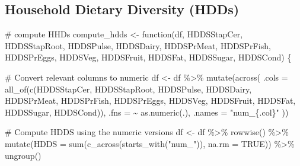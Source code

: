 \documentclass[
  letterpaper,
  DIV=11,
  numbers=noendperiod]{scrreprt}
\newenvironment{Shaded}{\begin{snugshade}}{\end{snugshade}}
\newcommand{\AttributeTok}[1]{\textcolor[rgb]{0.40,0.45,0.13}{#1}}
\newcommand{\CommentTok}[1]{\textcolor[rgb]{0.37,0.37,0.37}{#1}}
\newcommand{\ConstantTok}[1]{\textcolor[rgb]{0.56,0.35,0.01}{#1}}
\newcommand{\ControlFlowTok}[1]{\textcolor[rgb]{0.00,0.23,0.31}{#1}}
\newcommand{\FunctionTok}[1]{\textcolor[rgb]{0.28,0.35,0.67}{#1}}
\newcommand{\NormalTok}[1]{\textcolor[rgb]{0.00,0.23,0.31}{#1}}
\newcommand{\OtherTok}[1]{\textcolor[rgb]{0.00,0.23,0.31}{#1}}
\newcommand{\SpecialCharTok}[1]{\textcolor[rgb]{0.37,0.37,0.37}{#1}}
\newcommand{\StringTok}[1]{\textcolor[rgb]{0.13,0.47,0.30}{#1}}
\begin{document}
\hypertarget{household-dietary-diversity-hdds}{%
\subsection{Household Dietary Diversity
(HDDs)}\label{household-dietary-diversity-hdds}}

\begin{Shaded}
\begin{Highlighting}[]
\CommentTok{\# compute HHDs}
\NormalTok{compute\_hdds }\OtherTok{\textless{}{-}} \ControlFlowTok{function}\NormalTok{(df,}
\NormalTok{                         HDDSStapCer,}
\NormalTok{                         HDDSStapRoot,}
\NormalTok{                         HDDSPulse,}
\NormalTok{                         HDDSDairy,}
\NormalTok{                         HDDSPrMeat,}
\NormalTok{                         HDDSPrFish,}
\NormalTok{                         HDDSPrEggs,}
\NormalTok{                         HDDSVeg,}
\NormalTok{                         HDDSFruit,}
\NormalTok{                         HDDSFat,}
\NormalTok{                         HDDSSugar,}
\NormalTok{                         HDDSCond) \{}
  
  \CommentTok{\# Convert relevant columns to numeric}
\NormalTok{  df }\OtherTok{\textless{}{-}}\NormalTok{ df }\SpecialCharTok{\%\textgreater{}\%}
    \FunctionTok{mutate}\NormalTok{(}\FunctionTok{across}\NormalTok{(}
      \AttributeTok{.cols =} \FunctionTok{all\_of}\NormalTok{(}\FunctionTok{c}\NormalTok{(HDDSStapCer, HDDSStapRoot, HDDSPulse, HDDSDairy,}
\NormalTok{                       HDDSPrMeat, HDDSPrFish, HDDSPrEggs, HDDSVeg,}
\NormalTok{                       HDDSFruit, HDDSFat, HDDSSugar, HDDSCond)),}
      \AttributeTok{.fns =} \SpecialCharTok{\textasciitilde{}} \FunctionTok{as.numeric}\NormalTok{(.),}
      \AttributeTok{.names =} \StringTok{"num\_\{.col\}"}
\NormalTok{    ))}
  
  \CommentTok{\# Compute HDDS using the numeric versions}
\NormalTok{  df }\OtherTok{\textless{}{-}}\NormalTok{ df }\SpecialCharTok{\%\textgreater{}\%}
    \FunctionTok{rowwise}\NormalTok{() }\SpecialCharTok{\%\textgreater{}\%}
    \FunctionTok{mutate}\NormalTok{(}\AttributeTok{HDDS =} \FunctionTok{sum}\NormalTok{(}\FunctionTok{c\_across}\NormalTok{(}\FunctionTok{starts\_with}\NormalTok{(}\StringTok{"num\_"}\NormalTok{)), }\AttributeTok{na.rm =} \ConstantTok{TRUE}\NormalTok{)) }\SpecialCharTok{\%\textgreater{}\%}
    \FunctionTok{ungroup}\NormalTok{()}
  

\end{Highlighting}
\end{Shaded}
\end{document}
